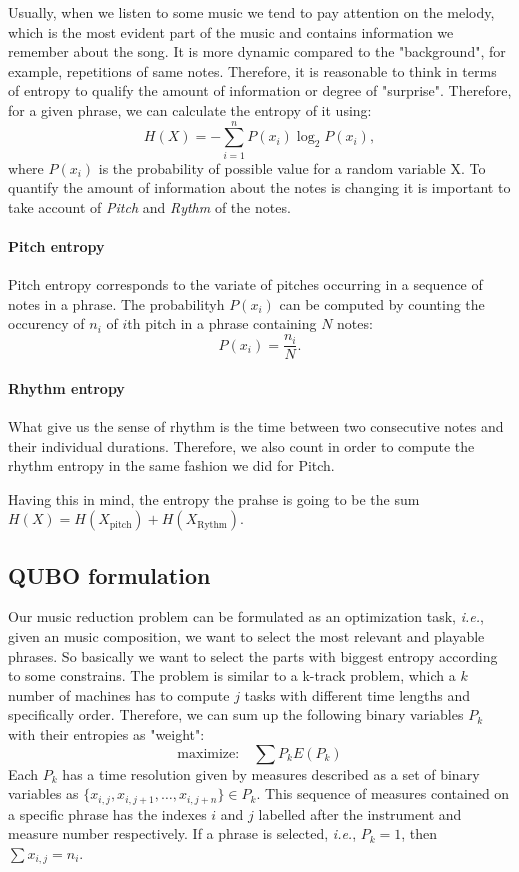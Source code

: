 \documentclass[a4paper,onecolumn,11pt,unpublished,allowfontchangeintitle]{quantumarticle}
\newcommand{\ie}{\emph{i.e.}}
\theoremstyle{definition}
\begin{document}
Usually, when we listen to some music we tend to pay attention on the melody, which is the most evident part of the music and contains information we remember about the song. It is more dynamic compared to the "background", for example, repetitions of same notes. Therefore, it is reasonable to think in terms of entropy to qualify the amount of information or degree of "surprise". Therefore, for a given phrase, we can calculate the entropy of it using:
\begin{equation}
H(X)=-\sum_{i=1}^{n} P\left(x_{i}\right) \log _{2} P\left(x_{i}\right) ,
\end{equation}
where $P(x_i)$ is the probability of possible value for a random variable X. To quantify the amount of information about the notes is changing it is important to take account of \emph{Pitch} and \emph{Rythm} of the notes.
\paragraph{Pitch entropy}
Pitch entropy corresponds to the variate of pitches occurring in a sequence of notes in a phrase. The probabilityh $P(x_i)$ can be computed by counting the occurency of $n_i$ of $i$th pitch in a phrase containing $N$ notes:
\begin{equation}
P\left(x_{i}\right)=\frac{n_{i}}{N}.
\end{equation}
\paragraph{Rhythm entropy}
What give us the sense of rhythm is the time between two consecutive notes and their individual durations. Therefore, we also count in order to compute the rhythm entropy in the same fashion we did for Pitch.

Having this in mind, the entropy the prahse is going to be the sum $H(X)=H(X_{\text{pitch}})+H(X_{\text{Rythm}})$.

\subsection{QUBO formulation}
Our music reduction problem can be formulated as an optimization task, \emph{i.e.}, given an music composition, we want to select the most relevant and playable phrases. So basically we want to select the parts with biggest entropy according to some constrains. The problem is similar to a k-track problem, which a $k$ number of machines has to compute $j$ tasks with different time lengths and specifically order. Therefore, we can sum up the following binary variables $P_k$ with their entropies as "weight":
\begin{equation}
	\text{maximize:} \quad \sum P_k E(P_k)
\end{equation}
Each $P_k$ has a time resolution given by measures described as a set of binary variables as $\{x_{i,j},x_{i,j+1},\dots, x_{i,j+n}\} \in P_k$. This sequence of measures contained on a specific phrase has the indexes $i$ and $j$ labelled after the instrument and measure number respectively. If a phrase is selected, \ie, $P_k = 1$, then $\sum x_{i,j}= n_i$.
\end{document}

